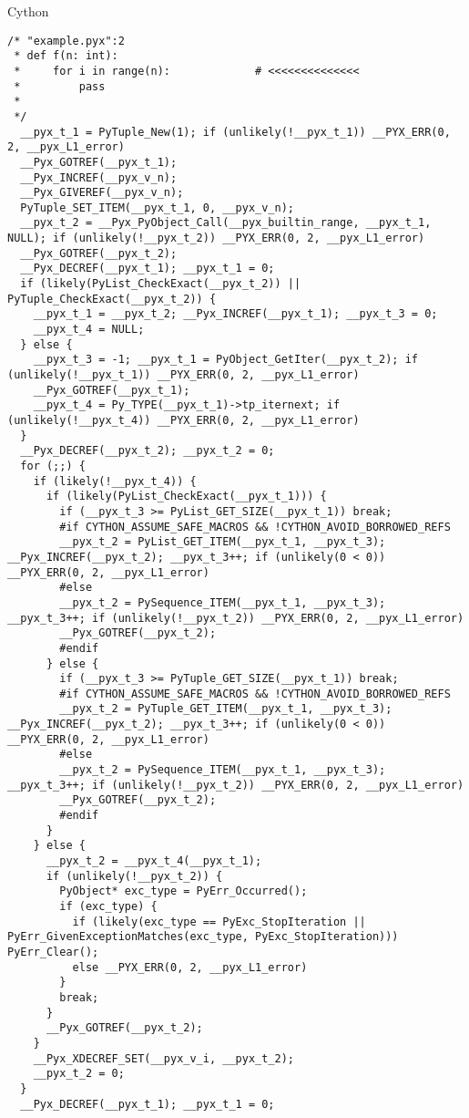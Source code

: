 \documentclass[10pt]{beamer}
\newcommand\supertiny{\fontsize{3}{3}\selectfont}
\begin{document}

\begin{frame}[fragile]{Cython}

\begin{verbatim}
/* "example.pyx":2
 * def f(n: int):
 *     for i in range(n):             # <<<<<<<<<<<<<<
 *         pass
 *
 */
  __pyx_t_1 = PyTuple_New(1); if (unlikely(!__pyx_t_1)) __PYX_ERR(0, 2, __pyx_L1_error)
  __Pyx_GOTREF(__pyx_t_1);
  __Pyx_INCREF(__pyx_v_n);
  __Pyx_GIVEREF(__pyx_v_n);
  PyTuple_SET_ITEM(__pyx_t_1, 0, __pyx_v_n);
  __pyx_t_2 = __Pyx_PyObject_Call(__pyx_builtin_range, __pyx_t_1, NULL); if (unlikely(!__pyx_t_2)) __PYX_ERR(0, 2, __pyx_L1_error)
  __Pyx_GOTREF(__pyx_t_2);
  __Pyx_DECREF(__pyx_t_1); __pyx_t_1 = 0;
  if (likely(PyList_CheckExact(__pyx_t_2)) || PyTuple_CheckExact(__pyx_t_2)) {
    __pyx_t_1 = __pyx_t_2; __Pyx_INCREF(__pyx_t_1); __pyx_t_3 = 0;
    __pyx_t_4 = NULL;
  } else {
    __pyx_t_3 = -1; __pyx_t_1 = PyObject_GetIter(__pyx_t_2); if (unlikely(!__pyx_t_1)) __PYX_ERR(0, 2, __pyx_L1_error)
    __Pyx_GOTREF(__pyx_t_1);
    __pyx_t_4 = Py_TYPE(__pyx_t_1)->tp_iternext; if (unlikely(!__pyx_t_4)) __PYX_ERR(0, 2, __pyx_L1_error)
  }
  __Pyx_DECREF(__pyx_t_2); __pyx_t_2 = 0;
  for (;;) {
    if (likely(!__pyx_t_4)) {
      if (likely(PyList_CheckExact(__pyx_t_1))) {
        if (__pyx_t_3 >= PyList_GET_SIZE(__pyx_t_1)) break;
        #if CYTHON_ASSUME_SAFE_MACROS && !CYTHON_AVOID_BORROWED_REFS
        __pyx_t_2 = PyList_GET_ITEM(__pyx_t_1, __pyx_t_3); __Pyx_INCREF(__pyx_t_2); __pyx_t_3++; if (unlikely(0 < 0)) __PYX_ERR(0, 2, __pyx_L1_error)
        #else
        __pyx_t_2 = PySequence_ITEM(__pyx_t_1, __pyx_t_3); __pyx_t_3++; if (unlikely(!__pyx_t_2)) __PYX_ERR(0, 2, __pyx_L1_error)
        __Pyx_GOTREF(__pyx_t_2);
        #endif
      } else {
        if (__pyx_t_3 >= PyTuple_GET_SIZE(__pyx_t_1)) break;
        #if CYTHON_ASSUME_SAFE_MACROS && !CYTHON_AVOID_BORROWED_REFS
        __pyx_t_2 = PyTuple_GET_ITEM(__pyx_t_1, __pyx_t_3); __Pyx_INCREF(__pyx_t_2); __pyx_t_3++; if (unlikely(0 < 0)) __PYX_ERR(0, 2, __pyx_L1_error)
        #else
        __pyx_t_2 = PySequence_ITEM(__pyx_t_1, __pyx_t_3); __pyx_t_3++; if (unlikely(!__pyx_t_2)) __PYX_ERR(0, 2, __pyx_L1_error)
        __Pyx_GOTREF(__pyx_t_2);
        #endif
      }
    } else {
      __pyx_t_2 = __pyx_t_4(__pyx_t_1);
      if (unlikely(!__pyx_t_2)) {
        PyObject* exc_type = PyErr_Occurred();
        if (exc_type) {
          if (likely(exc_type == PyExc_StopIteration || PyErr_GivenExceptionMatches(exc_type, PyExc_StopIteration))) PyErr_Clear();
          else __PYX_ERR(0, 2, __pyx_L1_error)
        }
        break;
      }
      __Pyx_GOTREF(__pyx_t_2);
    }
    __Pyx_XDECREF_SET(__pyx_v_i, __pyx_t_2);
    __pyx_t_2 = 0;
  }
  __Pyx_DECREF(__pyx_t_1); __pyx_t_1 = 0;
\end{verbatim}

\end{frame}
\end{document}
